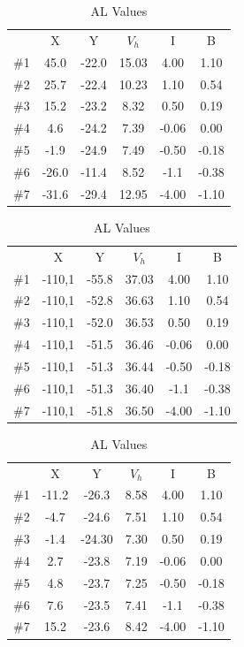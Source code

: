 \documentclass{article}
\begin{document}
\begin{table}[!htb]
	\centering
	\begin{minipage}{.5\linewidth}
		\caption{AG Values}
		\vspace{0.2cm}
		\begin{tabular}{c c c c c c}
			\hline\hline
			  & X & Y & $V_{h}$ & I & B \\ [1ex]
			\#1 & 45.0 & -22.0 & 15.03 & 4.00 & 1.10 \\
			\#2 & 25.7 & -22.4 & 10.23 & 1.10 & 0.54 \\
			\#3 & 15.2 & -23.2 & 8.32 & 0.50 & 0.19 \\
			\#4 & 4.6 & -24.2 & 7.39 & -0.06 & 0.00 \\
			\#5 & -1.9 & -24.9 & 7.49 & -0.50 & -0.18 \\
			\#6 & -26.0 & -11.4 & 8.52 & -1.1 & -0.38 \\
			\#7 & -31.6 & -29.4 & 12.95 & -4.00 & -1.10 \\ [1ex]
			\hline\hline
		\end{tabular}
	\end{minipage}
	\begin{minipage}{.5\linewidth}
		\caption{CU Values}
		\vspace{0.2cm}
		\begin{tabular}{c c c c c c}
			\hline\hline
			  & X & Y & $V_{h}$ & I & B \\ [1ex]
			\#1 & -110,1 & -55.8 & 37.03 & 4.00 & 1.10 \\
			\#2 & -110,1 & -52.8 & 36.63 & 1.10 & 0.54 \\
			\#3 & -110,1 & -52.0 & 36.53 & 0.50 & 0.19 \\
			\#4 & -110,1 & -51.5 & 36.46 & -0.06 & 0.00 \\
			\#5 & -110,1 & -51.3 & 36.44 & -0.50 & -0.18 \\
			\#6 & -110,1 & -51.3 & 36.40 & -1.1 & -0.38 \\
			\#7 & -110,1 & -51.8 & 36.50 & -4.00 & -1.10 \\ [1ex]
			\hline\hline
		\end{tabular}
	\end{minipage}
	\begin{minipage}{.5\linewidth}
		\caption{AL Values}
		\vspace{0.2cm}
		\begin{tabular}{c c c c c c}
			\hline\hline
			  & X & Y & $V_{h}$ & I & B \\ [1ex]
			\#1 & -11.2 & -26.3 & 8.58 & 4.00 & 1.10 \\
			\#2 & -4.7 & -24.6 & 7.51 & 1.10 & 0.54 \\
			\#3 & -1.4 & -24.30 & 7.30 & 0.50 & 0.19 \\
			\#4 & 2.7 & -23.8 & 7.19 & -0.06 & 0.00 \\
			\#5 & 4.8 & -23.7 & 7.25 & -0.50 & -0.18 \\
			\#6 & 7.6 & -23.5 & 7.41 & -1.1 & -0.38 \\
			\#7 & 15.2 & -23.6 & 8.42 & -4.00 & -1.10 \\ [1ex]
			\hline\hline
		\end{tabular}
	\end{minipage}
\end{table}
\end{document}
